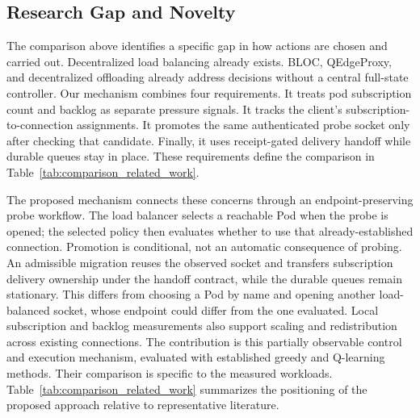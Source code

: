 \documentclass[manuscript,nonacm]{acmart}
\begin{document}
\subsection{Research Gap and Novelty}

The comparison above identifies a specific gap in how actions are chosen and
carried out. Decentralized load balancing already exists. BLOC, QEdgeProxy, and
decentralized offloading already address decisions without a central
full-state controller. Our mechanism combines four requirements. It treats
pod subscription count and backlog as separate pressure signals. It tracks
the client's subscription-to-connection assignments. It promotes the same
authenticated probe socket only after checking that candidate. Finally, it
uses receipt-gated delivery handoff while durable queues stay in place.
These requirements
define the comparison in Table~\ref{tab:comparison_related_work}.

The proposed mechanism connects these concerns through an endpoint-preserving
probe workflow. The load balancer selects a reachable Pod when the probe is
opened; the selected policy then evaluates whether to use that already-established connection.
Promotion is conditional, not an automatic consequence of probing. An
admissible migration reuses the observed socket and transfers subscription
delivery ownership under the handoff contract, while the durable queues remain
stationary. This differs from choosing a Pod by name and opening another
load-balanced socket, whose endpoint could differ from the one evaluated.
Local subscription and backlog measurements also support scaling and
redistribution across existing connections. The contribution is this
partially observable control and execution mechanism, evaluated with established
greedy and Q-learning methods. Their comparison is specific to the measured workloads.
Table~\ref{tab:comparison_related_work} summarizes the
positioning of the proposed approach relative to representative literature.
\end{document}
